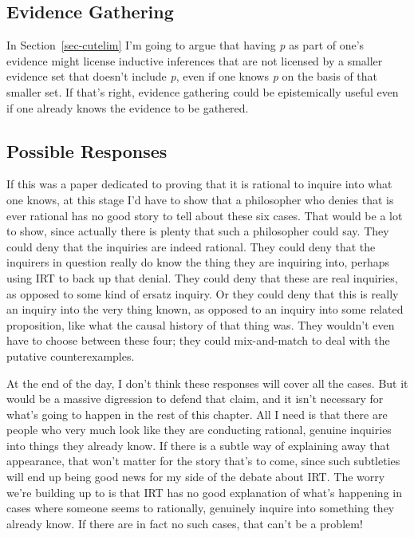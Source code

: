 \documentclass[
  10pt,
  letterpaper,
  twoside]{scrbook}
\begin{document}
\subsection{Evidence Gathering}\label{sec-evgather}

In Section~\ref{sec-cutelim} I'm going to argue that having \emph{p} as
part of one's evidence might license inductive inferences that are not
licensed by a smaller evidence set that doesn't include \emph{p}, even
if one knows \emph{p} on the basis of that smaller set. If that's right,
evidence gathering could be epistemically useful even if one already
knows the evidence to be gathered.

\subsection{Possible Responses}\label{sec-friedmaninquiry}

If this was a paper dedicated to proving that it is rational to inquire
into what one knows, at this stage I'd have to show that a philosopher
who denies that is ever rational has no good story to tell about these
six cases. That would be a lot to show, since actually there is plenty
that such a philosopher could say. They could deny that the inquiries
are indeed rational. They could deny that the inquirers in question
really do know the thing they are inquiring into, perhaps using IRT to
back up that denial. They could deny that these are real inquiries, as
opposed to some kind of ersatz inquiry. Or they could deny that this is
really an inquiry into the very thing known, as opposed to an inquiry
into some related proposition, like what the causal history of that
thing was. They wouldn't even have to choose between these four; they
could mix-and-match to deal with the putative counterexamples.

At the end of the day, I don't think these responses will cover all the
cases. But it would be a massive digression to defend that claim, and it
isn't necessary for what's going to happen in the rest of this chapter.
All I need is that there are people who very much look like they are
conducting rational, genuine inquiries into things they already know. If
there is a subtle way of explaining away that appearance, that won't
matter for the story that's to come, since such subtleties will end up
being good news for my side of the debate about IRT. The worry we're
building up to is that IRT has no good explanation of what's happening
in cases where someone seems to rationally, genuinely inquire into
something they already know. If there are in fact no such cases, that
can't be a problem!
\end{document}
